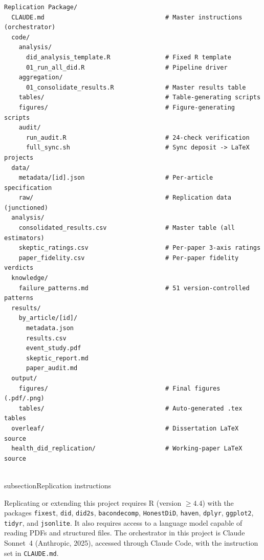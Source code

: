 \begin{tcolorbox}[colback=gray!5, colframe=gray!60, width=\textwidth]
\footnotesize
\begin{verbatim}
Replication Package/
  CLAUDE.md                                 # Master instructions (orchestrator)
  code/
    analysis/
      did_analysis_template.R               # Fixed R template
      01_run_all_did.R                      # Pipeline driver
    aggregation/
      01_consolidate_results.R              # Master results table
    tables/                                 # Table-generating scripts
    figures/                                # Figure-generating scripts
    audit/
      run_audit.R                           # 24-check verification
      full_sync.sh                          # Sync deposit -> LaTeX projects
  data/
    metadata/[id].json                      # Per-article specification
    raw/                                    # Replication data (junctioned)
  analysis/
    consolidated_results.csv                # Master table (all estimators)
    skeptic_ratings.csv                     # Per-paper 3-axis ratings
    paper_fidelity.csv                      # Per-paper fidelity verdicts
  knowledge/
    failure_patterns.md                     # 51 version-controlled patterns
  results/
    by_article/[id]/
      metadata.json
      results.csv
      event_study.pdf
      skeptic_report.md
      paper_audit.md
  output/
    figures/                                # Final figures (.pdf/.png)
    tables/                                 # Auto-generated .tex tables
  overleaf/                                 # Dissertation LaTeX source
  health_did_replication/                   # Working-paper LaTeX source
\end{verbatim}
\end{tcolorbox}


\\subsection{Replication instructions}
\label{sec:appc_replication}

Replicating or extending this project requires R (version $\geq 4.4$) with the packages \texttt{fixest}, \texttt{did}, \texttt{did2s}, \texttt{bacondecomp}, \texttt{HonestDiD}, \texttt{haven}, \texttt{dplyr}, \texttt{ggplot2}, \texttt{tidyr}, and \texttt{jsonlite}. It also requires access to a language model capable of reading PDFs and structured files. The orchestrator in this project is Claude Sonnet~4 (Anthropic, 2025), accessed through Claude Code, with the instruction set in \texttt{CLAUDE.md}.

